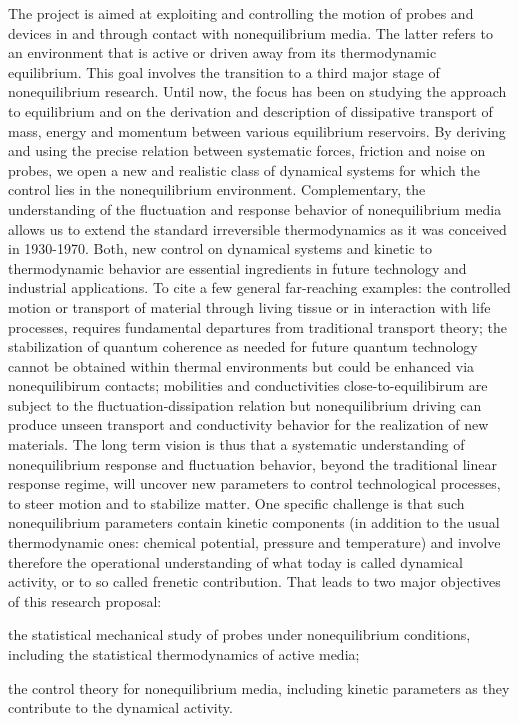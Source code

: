 The project is aimed at exploiting and controlling the motion of probes and devices in
and through contact with nonequilibrium media.  The latter refers to an environment that is active or driven away from its
thermodynamic equilibrium.
%
This goal involves the transition to a third major stage of
nonequilibrium research. Until now, the focus has been on studying the approach to equilibrium and on the
derivation and description of dissipative transport of mass, energy and momentum between
various equilibrium reservoirs.
%
By deriving and using the precise relation between systematic forces, friction
and noise on probes, we open  a new and realistic class of dynamical systems for which the control lies in the nonequilibrium environment.
Complementary, the understanding of the fluctuation and response behavior of
nonequilibrium media allows us to extend the standard irreversible thermodynamics as it was conceived in 1930-1970.  Both, new control on dynamical systems and kinetic to thermodynamic behavior  are essential ingredients
in future technology and industrial applications.  To cite a few general far-reaching examples:  the controlled motion or transport of material through living tissue or in interaction with life processes, requires fundamental departures
from traditional transport theory; the stabilization of quantum coherence as needed for future quantum technology cannot be obtained within thermal environments but could be enhanced via nonequilibirum contacts; mobilities and conductivities close-to-equilibirum are subject to the fluctuation-dissipation relation but nonequilibrium driving can produce unseen transport and conductivity behavior for the realization of new materials.
%
The long term vision is thus that a systematic understanding of nonequilibrium response and
fluctuation behavior, beyond the traditional linear response regime, will uncover new
parameters to control technological processes, to steer motion and to stabilize matter.
%
One specific challenge is that such nonequilibrium parameters contain kinetic components (in addition to the usual
thermodynamic ones: chemical potential, pressure and temperature) and involve therefore the
operational understanding of what today is called dynamical activity, or to so called frenetic contribution.
%
That leads to two major objectives of this research proposal:
\begin{inparaenum}[A.]
\item the statistical mechanical study of probes under nonequilibrium conditions, including the statistical thermodynamics of active media;
\item the control theory for nonequilibrium media, including kinetic parameters as they contribute to the dynamical activity.
\end{inparaenum}

